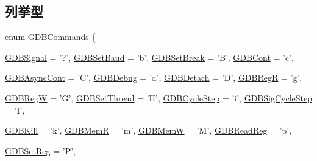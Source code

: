 \subsection*{列挙型}
\begin{DoxyCompactItemize}
\item 
enum \hyperlink{base_2remote__gdb_8hh_a5f3ce331fa8c2c19ed26b852847a3497}{GDBCommands} \{ \par
\hyperlink{base_2remote__gdb_8hh_a5f3ce331fa8c2c19ed26b852847a3497a9acb86313ec944166d9794e95485b9f3}{GDBSignal} =  '?', 
\hyperlink{base_2remote__gdb_8hh_a5f3ce331fa8c2c19ed26b852847a3497a32f6834a6d41a1b2cf93b990a8fb2802}{GDBSetBaud} =  'b', 
\hyperlink{base_2remote__gdb_8hh_a5f3ce331fa8c2c19ed26b852847a3497af183bccc532c34c0529414ed1a6d8d1d}{GDBSetBreak} =  'B', 
\hyperlink{base_2remote__gdb_8hh_a5f3ce331fa8c2c19ed26b852847a3497a5116c6ce41f7f6cbed15e76f7850d9b8}{GDBCont} =  'c', 
\par
\hyperlink{base_2remote__gdb_8hh_a5f3ce331fa8c2c19ed26b852847a3497a7f54d24132f309117d6df73a311401fc}{GDBAsyncCont} =  'C', 
\hyperlink{base_2remote__gdb_8hh_a5f3ce331fa8c2c19ed26b852847a3497a06eaad120ec15dd5f663afff69ca4abf}{GDBDebug} =  'd', 
\hyperlink{base_2remote__gdb_8hh_a5f3ce331fa8c2c19ed26b852847a3497a4329d2707e2615ebf514324e22c9147e}{GDBDetach} =  'D', 
\hyperlink{base_2remote__gdb_8hh_a5f3ce331fa8c2c19ed26b852847a3497a27e3f55ab7507805b07214ffc5112caa}{GDBRegR} =  'g', 
\par
\hyperlink{base_2remote__gdb_8hh_a5f3ce331fa8c2c19ed26b852847a3497af3ff51a9620f66082f6698de0521b986}{GDBRegW} =  'G', 
\hyperlink{base_2remote__gdb_8hh_a5f3ce331fa8c2c19ed26b852847a3497a719b61a9c713bbdcca7fc4148e899e7c}{GDBSetThread} =  'H', 
\hyperlink{base_2remote__gdb_8hh_a5f3ce331fa8c2c19ed26b852847a3497a2a20298cc6295ee66556e733118b34e2}{GDBCycleStep} =  'i', 
\hyperlink{base_2remote__gdb_8hh_a5f3ce331fa8c2c19ed26b852847a3497af33260007323a31a14dca0b20579bb35}{GDBSigCycleStep} =  'I', 
\par
\hyperlink{base_2remote__gdb_8hh_a5f3ce331fa8c2c19ed26b852847a3497a2ae8dcdea0e90eb0980507158b6478ea}{GDBKill} =  'k', 
\hyperlink{base_2remote__gdb_8hh_a5f3ce331fa8c2c19ed26b852847a3497afbcb02edcc4cb7d0f7fb2c8a9a82a3d4}{GDBMemR} =  'm', 
\hyperlink{base_2remote__gdb_8hh_a5f3ce331fa8c2c19ed26b852847a3497a6694323b497f2acbd690bb030eb36b8b}{GDBMemW} =  'M', 
\hyperlink{base_2remote__gdb_8hh_a5f3ce331fa8c2c19ed26b852847a3497a07fe6ffd98eb01494b115e860d52ade6}{GDBReadReg} =  'p', 
\par
\hyperlink{base_2remote__gdb_8hh_a5f3ce331fa8c2c19ed26b852847a3497a8a75153eb9b61ad50353ff07672f8453}{GDBSetReg} =  'P', 

\end{DoxyCompactItemize}
